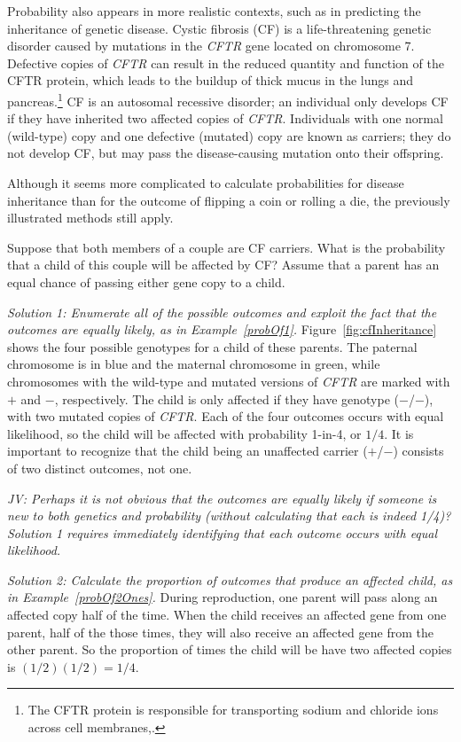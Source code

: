 Probability also appears in more realistic contexts, such as in predicting the inheritance of genetic disease. Cystic fibrosis (CF) is a life-threatening genetic disorder caused by mutations in the \textit{CFTR} gene located on chromosome 7. Defective copies of \textit{CFTR} can result in the reduced quantity and function of the CFTR protein, which leads to the buildup of thick mucus in the lungs and pancreas.\footnote{The CFTR protein is responsible for transporting sodium and chloride ions across cell membranes,.} CF is an autosomal recessive disorder; an individual only develops CF if they have inherited two affected copies of \textit{CFTR}. Individuals with one normal (wild-type) copy and one defective (mutated) copy are known as carriers; they do not develop CF, but may pass the disease-causing mutation onto their offspring.

Although it seems more complicated to calculate probabilities for disease inheritance than for the outcome of flipping a coin or rolling a die, the previously illustrated methods still apply.

\begin{example} {Suppose that both members of a couple are CF carriers. What is the probability that a child of this couple will be affected by CF? Assume that a parent has an equal chance of passing either gene copy to a child.}\label{CFInheritanceExample}

\textit{Solution 1: Enumerate all of the possible outcomes and exploit the fact that the outcomes are equally likely, as in Example~\ref{probOf1}.}  Figure~\ref{fig:cfInheritance} shows the four possible genotypes for a child of these parents. The paternal chromosome is in blue and the maternal chromosome in green, while chromosomes with the wild-type and mutated versions of \textit{CFTR} are marked with $+$ and $-$, respectively. The child is only affected if they have genotype ($-$/$-$), with two mutated copies of \textit{CFTR}. Each of the four outcomes occurs with equal likelihood, so the child will be affected with probability 1-in-4, or $1/4$.  It is important to recognize that the child being an unaffected carrier ($+$/$-$) consists of two distinct outcomes, not one. 

\textit{JV: Perhaps it is not obvious that the outcomes are equally likely if someone is new to both genetics and probability (without calculating that each is indeed 1/4)? Solution 1 requires immediately identifying that each outcome occurs with equal likelihood.}

\textit{Solution 2:  Calculate the proportion of outcomes that produce an affected child, as in Example~\ref{probOf2Ones}.}  During reproduction, one parent will pass along an affected copy half of the time.  When the child receives an affected gene from one parent, half of the those times, they will also receive an affected gene from the other parent.	So the proportion of times the child will be have two affected copies is $(1/2) (1/2) = 1/4$.
\end{example}

